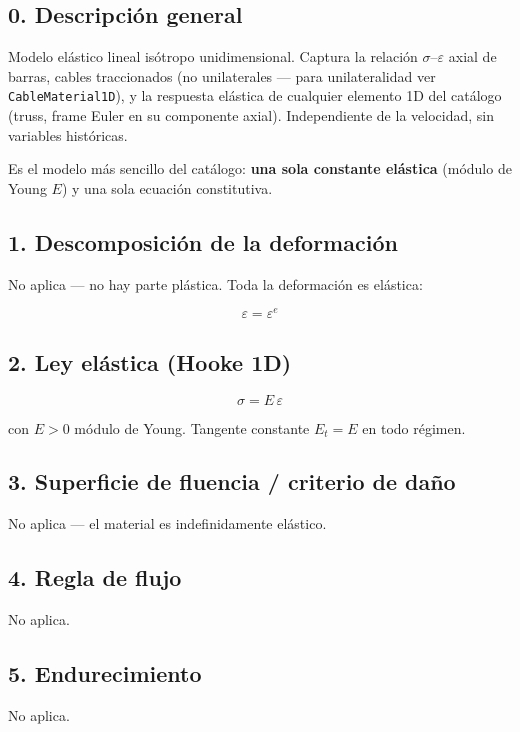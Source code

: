 \documentclass[11pt,letterpaper,oneside]{report}
\begin{document}
\subsection{0. Descripción general}

Modelo elástico lineal isótropo unidimensional. Captura la relación $\sigma$--$\varepsilon$ axial de barras, cables traccionados (no unilaterales --- para unilateralidad ver \texttt{CableMaterial1D}), y la respuesta elástica de cualquier elemento 1D del catálogo (truss, frame Euler en su componente axial). Independiente de la velocidad, sin variables históricas.

Es el modelo más sencillo del catálogo: \textbf{una sola constante elástica} (módulo de Young $E$) y una sola ecuación constitutiva.

\subsection{1. Descomposición de la deformación}

No aplica --- no hay parte plástica. Toda la deformación es elástica:

\[
\varepsilon = \varepsilon^e
\]

\subsection{2. Ley elástica (Hooke 1D)}

\[
\sigma = E\,\varepsilon
\]

con $E > 0$ módulo de Young. Tangente constante $E_t = E$ en todo régimen.

\subsection{3. Superficie de fluencia / criterio de daño}

No aplica --- el material es indefinidamente elástico.

\subsection{4. Regla de flujo}

No aplica.

\subsection{5. Endurecimiento}

No aplica.
\end{document}
